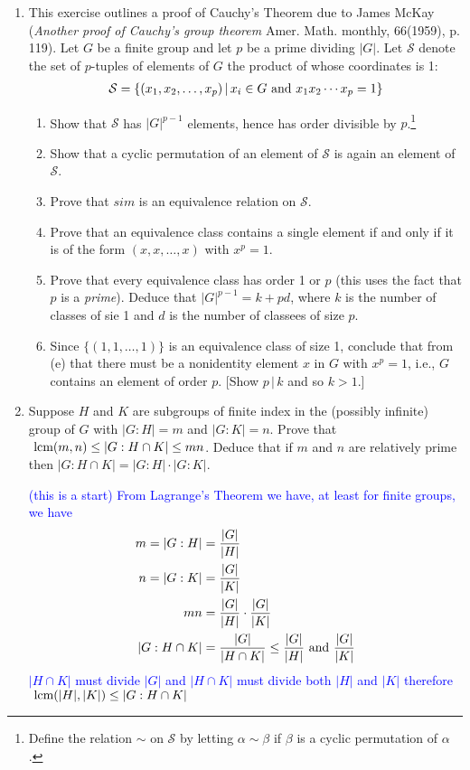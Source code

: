 \documentclass[10pt,a4paper]{report}
\newcommand{\BLUE}[1]{\textcolor{blue}{#1}}
\begin{document}
\begin{enumerate}
	\item This exercise outlines a proof of Cauchy's Theorem due to James McKay (\textit{Another proof of Cauchy's group theorem} Amer.  Math.  monthly, 66(1959), p. 119).  Let $G$ be a finite group and let $p$ be a prime dividing $|G|$.  Let $\mathcal{S}$ denote the set of $p$-tuples of elements of $G$ the product of whose coordinates is 1:
	\begin{align*}
		\mathcal{S} = \{(x_1,x_2,\dots,x_p)\,|\,x_i\in G \text{ and } x_1x_2\cdots x_p = 1\}
	\end{align*}
	\begin{enumerate}
		\item Show that $\mathcal{S}$ has $|G|^{p-1}$ elements, hence has order divisible by $p$.\footnote{Define the relation $\sim$ on $\mathcal{S}$ by letting $\alpha \sim \beta$ if $\beta$ is a cyclic permutation of $\alpha$.}
		\item Show that a cyclic permutation of an element of $\mathcal{S}$ is again an element of $\mathcal{S}$.
		
		\item Prove that $sim$ is an equivalence relation on $\mathcal{S}$.
		\item Prove that an equivalence class contains a single element if and only if it is of the form $(x,x,\dots,x)$ with $x^p=1$.
		\item Prove that every equivalence class has order 1 or $p$ (this uses the fact that $p$ is a \textit{prime}).  Deduce that $|G|^{p-1}=k+pd$,  where $k$ is the number of classes of sie 1 and $d$ is the number of classees of size $p$.
		\item Since $\{(1,1,\dots,1)\}$ is an equivalence class of size 1, conclude that from (e) that there must be a nonidentity element $x$ in $G$ with $x^p=1$, i.e., $G$ contains an element of order $p$. [Show $p\,|\,k$ and so $k >1$.]
	\end{enumerate}
	
	\item Suppose $H$ and $K$ are subgroups of finite index in the (possibly infinite) group of $G$ with $|G:H|=m$ and $|G:K|=n$.  Prove that $\text{ lcm}(m,n) \le|G:H\cap K| \le mn$.  Deduce that if $m$ and $n$ are relatively prime then $|G:H\cap K|=|G:H|\cdot|G:K|$.
	
	\BLUE{(this is a start) From Lagrange's Theorem we have, at least for finite groups, we have
	\begin{align*}
		m=|G:H| &= \frac{|G|}{|H|} \\
		n=|G:K| &= \frac{|G|}{|K|} \\
		mn &= \frac{|G|}{|H|}\cdot\frac{|G|}{|K|} \\
		|G:H\cap K| &= \frac{|G|}{|H\cap K|} \le \frac{|G|}{|H|}  \text{ and } \frac{|G|}{|K|}
	\end{align*} $|H\cap K|$ must divide $|G|$ and $|H\cap K|$ must divide both $|H|$ and $|K|$ therefore $\text{ lcm}(|H|,|K|)\le|G:H\cap K|$
	}
	

\end{enumerate}
\end{document}
